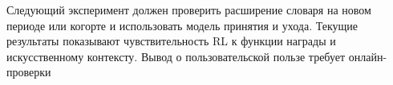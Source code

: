 Следующий эксперимент должен проверить расширение словаря
на новом периоде или когорте и использовать модель принятия и ухода.
Текущие результаты показывают чувствительность RL к функции награды
и искусственному контексту. Вывод о пользовательской пользе
требует онлайн-проверки
